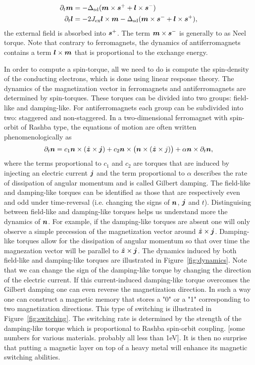 \begin{align}
    \partial_t \boldsymbol{m} &= -\Delta_\text{sd}(\boldsymbol{m}\times\boldsymbol{s}^++\boldsymbol{l}\times\boldsymbol{s}^-)\label{intro:eq:dm}\\
        \partial_t \boldsymbol{l} &=-2J_\text{ex}\boldsymbol{l}\times\boldsymbol{m} -\Delta_\text{sd}(\boldsymbol{m}\times\boldsymbol{s}^-+\boldsymbol{l}\times\boldsymbol{s}^+),\label{intro:eq:dl}
\end{align}
the external field is absorbed into $\boldsymbol{s}^+$. The term $\boldsymbol{m}\times\boldsymbol{s}^-$ is generally to as Neel torque. Note that contrary to ferromagnets, the dynamics of antiferromagnets contains a term $\boldsymbol{l}\times\boldsymbol{m}$ that is proportional to the exchange energy. 

In order to compute a spin-torque, all we need to do is compute the spin-density of the conducting electrons, which is done using linear response theory. 
The dynamics of the magnetization vector in ferromagnets and antiferromagnets are determined by spin-torques. These torques can be divided into two groups: field-like and damping-like. For antiferromagnets each group can be subdivided into two: staggered and non-staggered. In a two-dimensional ferromagnet with spin-orbit of Rashba type, the equations of motion are often written phenomenologically as
\begin{equation}
    \partial_t \boldsymbol{n} = c_1 \boldsymbol{n}\times (\hat{\boldsymbol{z}}\times\boldsymbol{j}) + c_2 \boldsymbol{n}\times\big(\boldsymbol{n}\times (\hat{\boldsymbol{z}}\times{j})\big) + \alpha \boldsymbol{n}\times \partial_t \boldsymbol{n},
\end{equation}
where the terms proportional to $c_1$ and $c_2$ are torques that are induced by injecting an electric current $\boldsymbol{j}$ and the term proportional to $\alpha$ describes the rate of dissipation of angular momentum and is called Gilbert damping. The field-like and damping-like torques can be identified as those that are respectively even and odd under time-reversal (i.e. changing the signs of $\boldsymbol{n}$, $\boldsymbol{j}$ and $t$). Distinguising between field-like and damping-like torques helps us understand more the dynamics of $\boldsymbol{n}$. For example, if the damping-like torques are absent one will only observe a simple precession of the magnetization vector around $\hat{\boldsymbol{z}}\times\boldsymbol{j}$. Damping-like torques allow for the dissipation of angular momentum so that over time the magnezation vector will be parallel to $\hat{\boldsymbol{z}}\times\boldsymbol{j}$. The dynamics induced by both field-like and damping-like torques are illustrated in Figure~\ref{fig:dynamics}. Note that we can change the sign of the damping-like torque by changing the direction of the electric current. If this current-induced damping-like torque overcomes the Gilbert damping one can even reverse the magnetization direction. In such a way one can construct a magnetic memory that stores a "0" or a "1" corresponding to two magnetization directions. This type of switching is illustrated in Figure~\ref{fig:switching}. The switching rate is determined by the strength of the damping-like torque which is proportional to Rashba spin-orbit coupling. {\color{blue} [some numbers for various materials. probably all less than 1eV].} It is then no surprise that putting a magnetic layer on top of a heavy metal will enhance its magnetic switching abilities. 

